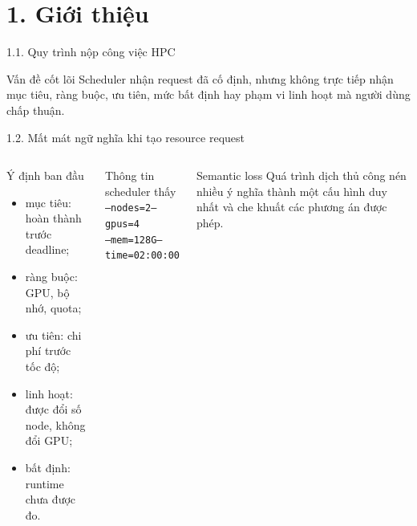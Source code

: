 \section{1. Giới thiệu}

\begin{frame}[t]{1.1. Quy trình nộp công việc HPC}
\small
\begin{center}
\end{center}
\begin{alertblock}{Vấn đề cốt lõi}
Scheduler nhận request đã cố định, nhưng không trực tiếp nhận mục tiêu, ràng buộc, ưu tiên, mức bất định hay phạm vi linh hoạt mà người dùng chấp thuận.
\end{alertblock}
\end{frame}

\begin{frame}[t]{1.2. Mất mát ngữ nghĩa khi tạo resource request}
\small
\begin{columns}[T]
\begin{block}{Ý định ban đầu}
\begin{itemize}
  \item mục tiêu: hoàn thành trước deadline;
  \item ràng buộc: GPU, bộ nhớ, quota;
  \item ưu tiên: chi phí trước tốc độ;
  \item linh hoạt: được đổi số node, không đổi GPU;
  \item bất định: runtime chưa được đo.
\end{itemize}
\end{block}
\begin{block}{Thông tin scheduler thấy}
\texttt{--nodes=2}\quad \texttt{--gpus=4}\\
\texttt{--mem=128G}\quad \texttt{--time=02:00:00}
\end{block}
\begin{alertblock}{Semantic loss}
Quá trình dịch thủ công nén nhiều ý nghĩa thành một cấu hình duy nhất và che khuất các phương án được phép.
\end{alertblock}
\end{columns}
\end{frame}

